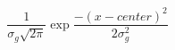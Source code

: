 \documentclass[10pt]{article}
\begin{document}
\[\frac{1}{\sigma_g\sqrt{2\pi}}\exp \frac{-(x - center)^2 } { 2 \sigma_g^2}
\]
\end{document}
